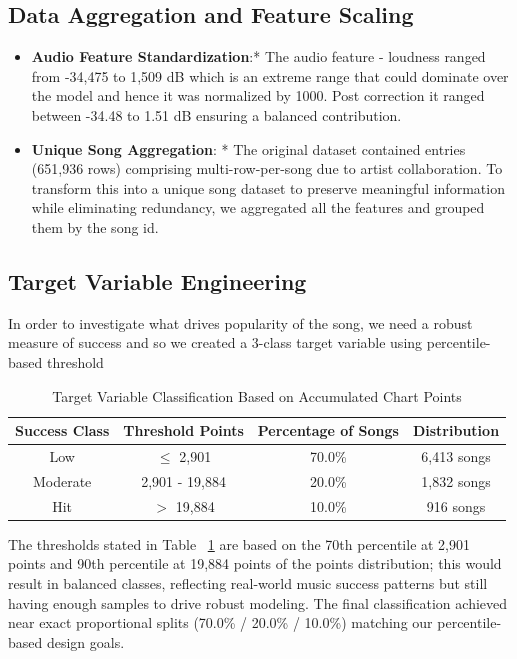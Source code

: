 \documentclass{article}
\begin{document}
\subsection{Data Aggregation and Feature Scaling}
\begin{itemize}
    \item \textbf{Audio Feature Standardization}:* The audio feature - loudness ranged from -34,475 to 1,509 dB which is an extreme range that could dominate over the model and hence it was normalized by 1000. Post correction it ranged between -34.48 to 1.51 dB ensuring a balanced contribution.

    \item \textbf{Unique Song Aggregation}: * The original dataset contained entries (651,936 rows) comprising multi-row-per-song due to artist collaboration. To transform this into a unique song dataset to preserve meaningful information while eliminating redundancy, we aggregated all the features and grouped them by the song id.

\end{itemize}

\subsection{Target Variable Engineering}
In order to investigate what drives popularity of the song, we need a robust measure of success and so we created a 3-class target variable using percentile-based threshold

\begin{table}[h!]
\centering
\begin{tabular}{|c|c|c|c|}
\hline
\textbf{Success Class} & \textbf{Threshold Points} & \textbf{Percentage of Songs} & \textbf{Distribution} \\
\hline
Low & $\leq$ 2,901 & 70.0\% & 6,413 songs \\
\hline
Moderate & 2,901 - 19,884 & 20.0\% & 1,832 songs \\
\hline
Hit & $>$ 19,884 & 10.0\% & 916 songs \\
\hline
\end{tabular}
\vspace*{0.2cm}
\caption{Target Variable Classification Based on Accumulated Chart Points}
\label{tab:target_variable}
\end{table}

The thresholds stated in Table ~\ref{tab:target_variable} are based on the 70th percentile at 2,901 points and 90th percentile at 19,884 points of the points distribution; this would result in balanced classes, reflecting real-world music success patterns but still having enough samples to drive robust modeling.
The final classification achieved near exact proportional splits (70.0\% / 20.0\% / 10.0\%) matching our percentile-based design goals.
\end{document}
